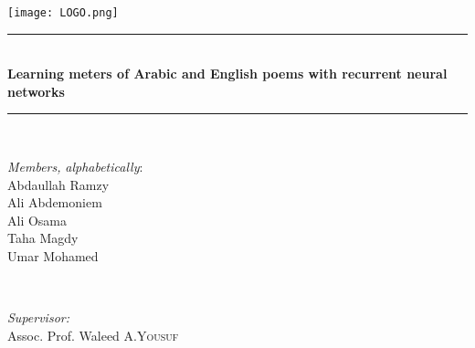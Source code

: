 \documentclass[12pt]{report}
\let\keptmaketitle\maketitle %
\let\maketitle\keptmaketitle %
\begin{document}
%



\begin{titlepage}

\newcommand{\HRule}{\rule{\linewidth}{0.5mm}} %

\center %
\texttt{[image: LOGO.png]}\\[1cm]
 



\HRule \\[.4cm]
{ \LARGE \bfseries Learning meters of Arabic and English poems with recurrent
neural networks}\\[0.4cm] %
\HRule \\[3cm]
 

\begin{minipage}{0.4\textwidth}
\begin{flushleft} \large
\textit{Members,} \textit{\small alphabetically}:\\

Abdaullah Ramzy\\
Ali Abdemoniem\\
Ali Osama\\
Taha Magdy\\
Umar Mohamed\\
\end{flushleft}
\end{minipage}
~
\begin{minipage}{0.5\textwidth}
\begin{flushright} \large
\textit{Supervisor:} \\
Assoc. Prof. Waleed A.\textsc{Yousuf} %
\end{flushright}
\end{minipage}\\[3.5cm]


\end{titlepage}
\end{document}
